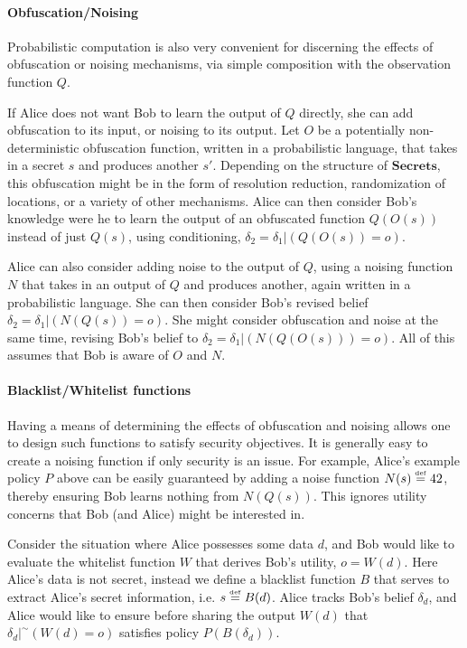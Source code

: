 \documentclass{article} %
\newcommand{\secrets}[0]{\textbf{Secrets}}
\newcommand{\paren}[1]{\left( #1 \right)}
\newcommand{\cond}[0]{|}
\newcommand{\stacklabel}[1]{\stackrel{\smash{\scriptscriptstyle \mathrm{#1}}}}
\newcommand{\defeq}{\stacklabel{def}=}
\theoremstyle{plain} %
\theoremstyle{definition} %
\begin{document}
\paragraph*{Obfuscation/Noising} Probabilistic computation is also very
convenient for discerning the effects of obfuscation or noising
mechanisms, via simple composition with the observation function $ Q
$.

If Alice does not want Bob to learn the output of $ Q $ directly, she
can add obfuscation to its input, or noising to its output. Let $ O $
be a potentially non-deterministic obfuscation function, written in a
probabilistic language, that takes in a secret $ s $ and produces
another $ s' $. Depending on the structure of $ \secrets $, this
obfuscation might be in the form of resolution reduction,
randomization of locations, or a variety of other mechanisms. Alice
can then consider Bob's knowledge were he to learn the output of an
obfuscated function $ Q(O(s)) $ instead of just $ Q(s) $, using
conditioning, $ \delta_2 = \delta_1 \cond \paren{Q(O(s)) = o} $.

Alice can also consider adding noise to the output of $ Q $, using a
noising function $ N $ that takes in an output of $ Q $ and produces
another, again written in a probabilistic language. She can then
consider Bob's revised belief $ \delta_2 = \delta_1 \cond
\paren{N(Q(s)) = o} $. She might consider obfuscation and noise at the
same time, revising Bob's belief to $ \delta_2 = \delta_1 \cond
\paren{N(Q(O(s))) = o} $. All of this assumes that Bob is aware of $ O
$ and $ N $.

\paragraph*{Blacklist/Whitelist functions} Having a means of
determining the effects of obfuscation and noising allows one to
design such functions to satisfy security objectives. It is
generally easy to create a noising function if only security is an
issue. For example, Alice's example policy $ P $ above can be easily
guaranteed by adding a noise function $ N(s) \defeq 42 $,
thereby ensuring Bob learns nothing from $ N(Q(s)) $. This ignores
utility concerns that Bob (and Alice) might be interested in.

Consider the situation where Alice possesses some data $ d $, and Bob would
like to evaluate the whitelist function $ W $ that derives Bob's
utility, $ o = W(d) $. Here Alice's data is not secret, instead
we define a blacklist function $ B $ that serves to extract Alice's 
secret information, i.e. $ s \defeq B(d) $. Alice tracks Bob's belief
$ \delta_d $, and Alice would like to ensure before sharing the output 
$ W(d) $ that $\delta_d |^\sim (W(d) = o)$ satisfies policy $ P(B(\delta_d)) $.
\end{document}
